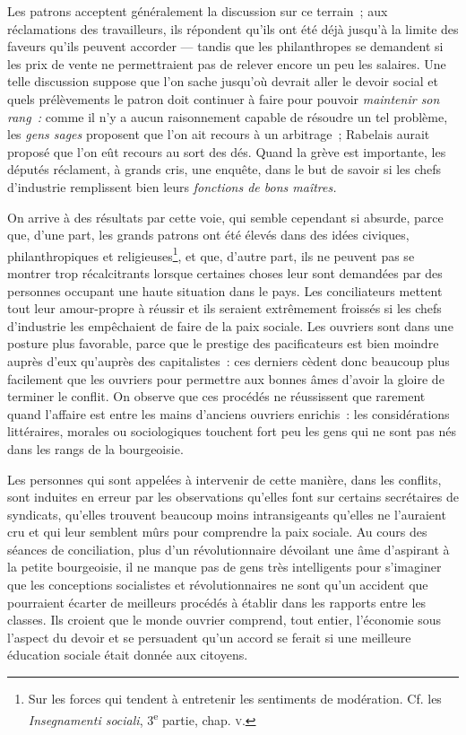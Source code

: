 \documentclass[french,twoside]{book} %
\begin{document}
Les patrons acceptent généralement la discussion sur ce terrain ; aux réclamations des travailleurs, ils répondent qu’ils ont été déjà jusqu’à la limite des faveurs qu’ils peuvent accorder — tandis que les philanthropes se demandent si les prix de vente ne permettraient pas de relever encore un peu les salaires. Une telle discussion suppose que l’on sache jusqu’où devrait aller le devoir social et quels prélèvements le patron doit continuer à faire pour pouvoir \emph{maintenir son rang :} comme il n’y a aucun raisonnement capable de résoudre un tel problème, les \emph{gens sages} proposent que l’on ait recours à un arbitrage ; Rabelais aurait proposé que l’on eût recours au sort des dés. Quand la grève est importante, les députés réclament, à grands cris, une enquête, dans le but de savoir si les chefs d’industrie remplissent bien leurs \emph{fonctions de bons maîtres.}\par
On arrive à des résultats par cette voie, qui semble cependant si absurde, parce que, d’une part, les grands patrons ont été élevés dans des idées civiques, philanthropiques et religieuses\footnote{ \noindent Sur les forces qui tendent à entretenir les sentiments de modération. Cf. les \emph{Insegnamenti sociali}, 3\textsuperscript{e} partie, chap. {\scshape v}.
 }, et que, d’autre part, ils ne  peuvent pas se montrer trop récalcitrants lorsque certaines choses leur sont demandées par des personnes occupant une haute situation dans le pays. Les conciliateurs mettent tout leur amour-propre à réussir et ils seraient extrêmement froissés si les chefs d’industrie les empêchaient de faire de la paix sociale. Les ouvriers sont dans une posture plus favorable, parce que le prestige des pacificateurs est bien moindre auprès d’eux qu’auprès des capitalistes : ces derniers cèdent donc beaucoup plus facilement que les ouvriers pour permettre aux bonnes âmes d’avoir la gloire de terminer le conflit. On observe que ces procédés ne réussissent que rarement quand l’affaire est entre les mains d’anciens ouvriers enrichis : les considérations littéraires, morales ou sociologiques touchent fort peu les gens qui ne sont pas nés dans les rangs de la bourgeoisie.\par
Les personnes qui sont appelées à intervenir de cette manière, dans les conflits, sont induites en erreur par les observations qu’elles font sur certains secrétaires de syndicats, qu’elles trouvent beaucoup moins intransigeants qu’elles ne l’auraient cru et qui leur semblent mûrs pour comprendre la paix sociale. Au cours des séances de conciliation, plus d’un révolutionnaire dévoilant une âme d’aspirant à la petite bourgeoisie, il ne manque pas de gens très intelligents pour s’imaginer que les conceptions socialistes et révolutionnaires ne sont qu’un accident que pourraient écarter de meilleurs procédés à établir dans les rapports entre les classes. Ils croient que le monde ouvrier comprend, tout entier, l’économie sous l’aspect du devoir et se persuadent qu’un  accord se ferait si une meilleure éducation sociale était donnée aux citoyens.\par
\end{document}
